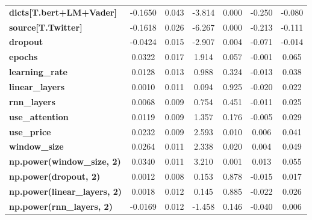 \begin{center}
\begin{tabular}{lcccccc}
\textbf{dicts[T.bert+LM+Vader]}      &      -0.1650  &        0.043     &    -3.814  &         0.000        &       -0.250    &       -0.080     \\
\textbf{source[T.Twitter]}           &      -0.1618  &        0.026     &    -6.267  &         0.000        &       -0.213    &       -0.111     \\
\textbf{dropout}                     &      -0.0424  &        0.015     &    -2.907  &         0.004        &       -0.071    &       -0.014     \\
\textbf{epochs}                      &       0.0322  &        0.017     &     1.914  &         0.057        &       -0.001    &        0.065     \\
\textbf{learning\_rate}              &       0.0128  &        0.013     &     0.988  &         0.324        &       -0.013    &        0.038     \\
\textbf{linear\_layers}              &       0.0010  &        0.011     &     0.094  &         0.925        &       -0.020    &        0.022     \\
\textbf{rnn\_layers}                 &       0.0068  &        0.009     &     0.754  &         0.451        &       -0.011    &        0.025     \\
\textbf{use\_attention}              &       0.0119  &        0.009     &     1.357  &         0.176        &       -0.005    &        0.029     \\
\textbf{use\_price}                  &       0.0232  &        0.009     &     2.593  &         0.010        &        0.006    &        0.041     \\
\textbf{window\_size}                &       0.0264  &        0.011     &     2.338  &         0.020        &        0.004    &        0.049     \\
\textbf{np.power(window\_size, 2)}   &       0.0340  &        0.011     &     3.210  &         0.001        &        0.013    &        0.055     \\
\textbf{np.power(dropout, 2)}        &       0.0012  &        0.008     &     0.153  &         0.878        &       -0.015    &        0.017     \\
\textbf{np.power(linear\_layers, 2)} &       0.0018  &        0.012     &     0.145  &         0.885        &       -0.022    &        0.026     \\
\textbf{np.power(rnn\_layers, 2)}    &      -0.0169  &        0.012     &    -1.458  &         0.146        &       -0.040    &        0.006     \\

\end{tabular}
\end{center}
